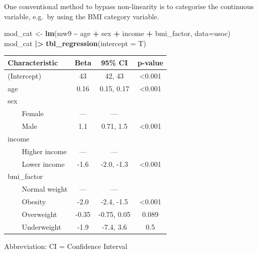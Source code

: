 \documentclass[
]{book}
\newenvironment{Shaded}{\begin{snugshade}}{\end{snugshade}}
\newcommand{\AttributeTok}[1]{\textcolor[rgb]{0.13,0.29,0.53}{#1}}
\newcommand{\FunctionTok}[1]{\textcolor[rgb]{0.13,0.29,0.53}{\textbf{#1}}}
\newcommand{\NormalTok}[1]{#1}
\newcommand{\OtherTok}[1]{\textcolor[rgb]{0.56,0.35,0.01}{#1}}
\newcommand{\SpecialCharTok}[1]{\textcolor[rgb]{0.81,0.36,0.00}{\textbf{#1}}}
\begin{document}
One conventional method to bypass non-linearity is to categorise the continuous variable, e.g.~by using the BMI category variable.

\begin{Shaded}
\begin{Highlighting}[]
\NormalTok{mod\_cat }\OtherTok{\textless{}{-}} \FunctionTok{lm}\NormalTok{(mw9 }\SpecialCharTok{\textasciitilde{}}\NormalTok{ age }\SpecialCharTok{+}\NormalTok{ sex }\SpecialCharTok{+}\NormalTok{ income }\SpecialCharTok{+}\NormalTok{ bmi\_factor, }\AttributeTok{data=}\NormalTok{usoc)}
\NormalTok{mod\_cat }\SpecialCharTok{|\textgreater{}} \FunctionTok{tbl\_regression}\NormalTok{(}\AttributeTok{intercept =}\NormalTok{ T)}
\end{Highlighting}
\end{Shaded}

\begin{table}[t]
\fontsize{12.0pt}{14.0pt}\selectfont
\begin{tabular*}{\linewidth}{@{\extracolsep{\fill}}lccc}
\toprule
\textbf{Characteristic} & \textbf{Beta} & \textbf{95\% CI} & \textbf{p-value} \\ 
\midrule\addlinespace[2.5pt]
(Intercept) & 43 & 42, 43 & <0.001 \\ 
age & 0.16 & 0.15, 0.17 & <0.001 \\ 
sex &  &  &  \\ 
    Female & — & — &  \\ 
    Male & 1.1 & 0.71, 1.5 & <0.001 \\ 
income &  &  &  \\ 
    Higher income & — & — &  \\ 
    Lower income & -1.6 & -2.0, -1.3 & <0.001 \\ 
bmi\_factor &  &  &  \\ 
    Normal weight & — & — &  \\ 
    Obesity & -2.0 & -2.4, -1.5 & <0.001 \\ 
    Overweight & -0.35 & -0.75, 0.05 & 0.089 \\ 
    Underweight & -1.9 & -7.4, 3.6 & 0.5 \\ 
\bottomrule
\end{tabular*}
\begin{minipage}{\linewidth}
\vspace{.05em}
Abbreviation: CI = Confidence Interval\\
\end{minipage}
\end{table}
\end{document}
